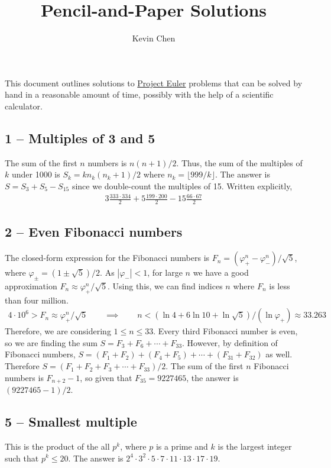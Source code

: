 \documentclass{article}
\title{Pencil-and-Paper Solutions}
\author{Kevin Chen}
\begin{document}
\maketitle

This document outlines solutions to \href{https://projecteuler.net/}{Project Euler} problems that can be solved by hand in a reasonable amount of time, possibly with the help of a scientific calculator. \\

\subsection*{1 -- Multiples of 3 and 5}
The sum of the first $n$ numbers is $n(n+1)/2$.
Thus, the sum of the multiples of $k$ under 1000 is $S_k = k n_k(n_k+1)/2$ where $n_k=\lfloor 999/k \rfloor$.
The answer is $S = S_3 + S_5 - S_{15}$ since we double-count the multiples of 15.
Written explicitly,
\begin{align*}
	\boxed{ 3\frac{333 \cdot 334}{2} + 5\frac{199 \cdot 200}{2} - 15\frac{66 \cdot 67}{2} }
\end{align*}


\subsection*{2 -- Even Fibonacci numbers}
The closed-form expression for the Fibonacci numbers is $F_n = (\varphi_+^n - \varphi_-^n)/\sqrt{5}$, where $\varphi_\pm = (1\pm\sqrt{5})/2$.
As $|\varphi_-| < 1$, for large $n$ we have a good approximation $F_n \approx \varphi_+^n/\sqrt{5}$.
Using this, we can find indices $n$ where $F_n$ is less than four million.
\begin{align*}
	4 \cdot 10^6 > F_n \approx \varphi_+^n/\sqrt{5} \qquad\implies\qquad n < (\ln 4 + 6 \ln 10 + \ln \sqrt{5})/(\ln \varphi_+) \approx 33.263
\end{align*}
Therefore, we are considering $1 \leq n \leq 33$.
Every third Fibonacci number is even, so we are finding the sum $S = F_3 + F_6 + \cdots + F_{33}$.
However, by definition of Fibonacci numbers, $S = (F_1 + F_2) + (F_4 + F_5) + \cdots + (F_{31} + F_{32})$ as well.
Therefore $S = (F_1 + F_2 + F_3 + \cdots + F_{33})/2$.
The sum of the first $n$ Fibonacci numbers is $F_{n+2} - 1$, so given that $F_{35} = 9227465$, the answer is $\boxed{ (9227465 - 1)/2 }$.


\subsection*{5 -- Smallest multiple}
This is the product of the all $p^k$, where $p$ is a prime and $k$ is the largest integer such that $p^k \leq 20$.
The answer is $\boxed{ 2^4 \cdot 3^2 \cdot 5 \cdot 7 \cdot 11 \cdot 13 \cdot 17 \cdot 19}$.
\end{document}
